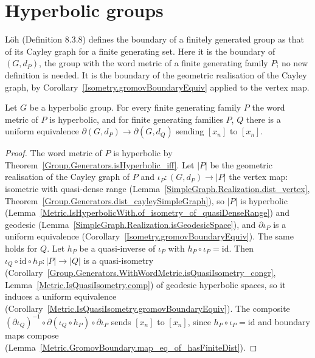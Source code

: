 \section*{Hyperbolic groups}

L\"oh (Definition 8.3.8) defines the boundary of a finitely generated group as that of its Cayley
graph for a finite generating set. Here it is the boundary of $(G, d_P)$, the group with the word
metric of a finite generating family $P$; no new definition is needed. It is the boundary of the
geometric realisation of the Cayley graph, by Corollary~\ref{Isometry.gromovBoundaryEquiv} applied
to
the vertex map.

\begin{theorem}
  \label{Group.Generators.WithWordMetric.gromovBoundaryEquiv}
  Let $G$ be a hyperbolic group. For every finite generating family $P$ the word metric of $P$ is
  hyperbolic, and for finite generating families $P$, $Q$ there is a uniform equivalence
  $\partial(G, d_P) \to \partial(G, d_Q)$ sending $[x_n]$ to $[x_n]$.
\end{theorem}
\begin{proof}
  The word metric of $P$ is hyperbolic by Theorem~\ref{Group.Generators.isHyperbolic_iff}. Let $|P|$
  be the geometric realisation of the Cayley graph of $P$ and $\iota_P \colon (G, d_P) \to |P|$ the
  vertex map: isometric with quasi-dense range
  (Lemma~\ref{SimpleGraph.Realization.dist_vertex},
  Theorem~\ref{Group.Generators.dist_cayleySimpleGraph}), so $|P|$ is hyperbolic
  (Lemma~\ref{Metric.IsHyperbolicWith.of_isometry_of_quasiDenseRange}) and geodesic
  (Lemma~\ref{SimpleGraph.Realization.isGeodesicSpace}), and $\partial \iota_P$ is a uniform
  equivalence (Corollary~\ref{Isometry.gromovBoundaryEquiv}). The same holds for $Q$. Let $h_P$ be a
  quasi-inverse of $\iota_P$ with $h_P \circ \iota_P = \mathrm{id}$. Then $\iota_Q \circ \mathrm{id}
  \circ h_P \colon |P| \to |Q|$ is a quasi-isometry
  (Corollary~\ref{Group.Generators.WithWordMetric.isQuasiIsometry_congr},
  Lemma~\ref{Metric.IsQuasiIsometry.comp}) of geodesic hyperbolic spaces, so it induces a uniform
  equivalence (Corollary~\ref{Metric.IsQuasiIsometry.gromovBoundaryEquiv}). The composite
  $(\partial \iota_Q)^{-1} \circ \partial(\iota_Q \circ h_P) \circ \partial \iota_P$ sends $[x_n]$
  to $[x_n]$, since $h_P \circ \iota_P = \mathrm{id}$ and boundary maps compose
  (Lemma~\ref{Metric.GromovBoundary.map_eq_of_hasFiniteDist}).
\end{proof}
